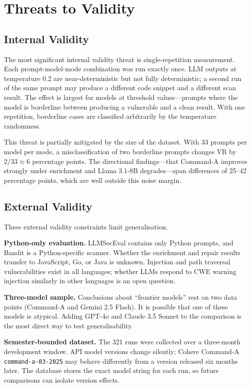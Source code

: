 \documentclass[12pt,a4paper]{report}
\begin{document}
\section{Threats to Validity}
\label{sec:threats}

\subsection{Internal Validity}

The most significant internal validity threat is single-repetition measurement.
Each prompt-model-mode combination was run exactly once. LLM outputs at
temperature 0.2 are near-deterministic but not fully deterministic; a second run
of the same prompt may produce a different code snippet and a different scan
result. The effect is largest for models at threshold values---prompts where the
model is borderline between producing a vulnerable and a clean result. With one
repetition, borderline cases are classified arbitrarily by the temperature
randomness.

This threat is partially mitigated by the size of the dataset. With 33 prompts
per model per mode, a misclassification of two borderline prompts changes VR by
$2/33 \approx 6$ percentage points. The directional findings---that Command-A
improves strongly under enrichment and Llama 3.1-8B degrades---span differences
of 25--42 percentage points, which are well outside this noise margin.

\subsection{External Validity}

Three external validity constraints limit generalisation.

\textbf{Python-only evaluation.} LLMSecEval contains only Python prompts, and
Bandit is a Python-specific scanner. Whether the enrichment and repair results
transfer to JavaScript, Go, or Java is unknown. Injection and path traversal
vulnerabilities exist in all languages; whether LLMs respond to CWE warning
injection similarly in other languages is an open question.

\textbf{Three-model sample.} Conclusions about ``frontier models'' rest on two
data points (Command-A and Gemini 2.5 Flash). It is possible that one of these
models is atypical. Adding GPT-4o and Claude 3.5 Sonnet to the comparison is
the most direct way to test generalisability.

\textbf{Semester-bounded dataset.} The 321 runs were collected over a three-month
development window. API model versions change silently; Cohere Command-A
\texttt{command-a-03-2025} may behave differently from a version released six
months later. The database stores the exact model string for each run, so future
comparisons can isolate version effects.
\end{document}
